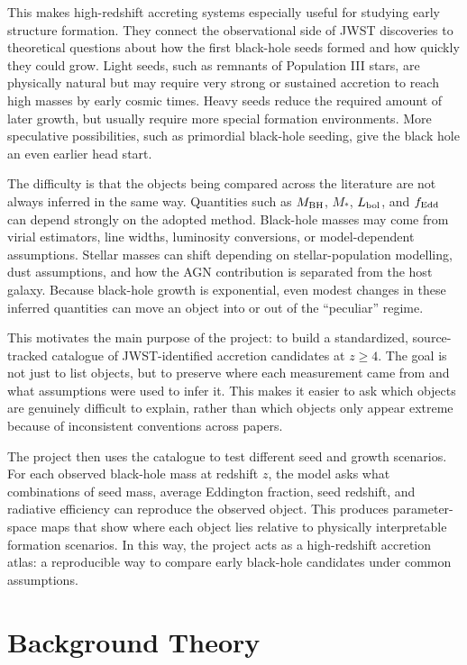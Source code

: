 \documentclass[letterpaper,12pt]{article}
\begin{document}
This makes high-redshift accreting systems especially useful for studying early structure formation. They connect the observational side of JWST discoveries to theoretical questions about how the first black-hole seeds formed and how quickly they could grow. Light seeds, such as remnants of Population III stars, are physically natural but may require very strong or sustained accretion to reach high masses by early cosmic times. Heavy seeds reduce the required amount of later growth, but usually require more special formation environments. More speculative possibilities, such as primordial black-hole seeding, give the black hole an even earlier head start.

The difficulty is that the objects being compared across the literature are not always inferred in the same way. Quantities such as $M_{\rm BH}$, $M_{*}$, $L_{\rm bol}$, and $f_{\rm Edd}$ can depend strongly on the adopted method. Black-hole masses may come from virial estimators, line widths, luminosity conversions, or model-dependent assumptions. Stellar masses can shift depending on stellar-population modelling, dust assumptions, and how the AGN contribution is separated from the host galaxy. Because black-hole growth is exponential, even modest changes in these inferred quantities can move an object into or out of the ``peculiar'' regime.

This motivates the main purpose of the project: to build a standardized, source-tracked catalogue of JWST-identified accretion candidates at $z \geq 4$. The goal is not just to list objects, but to preserve where each measurement came from and what assumptions were used to infer it. This makes it easier to ask which objects are genuinely difficult to explain, rather than which objects only appear extreme because of inconsistent conventions across papers.

The project then uses the catalogue to test different seed and growth scenarios. For each observed black-hole mass at redshift $z$, the model asks what combinations of seed mass, average Eddington fraction, seed redshift, and radiative efficiency can reproduce the observed object. This produces parameter-space maps that show where each object lies relative to physically interpretable formation scenarios. In this way, the project acts as a high-redshift accretion atlas: a reproducible way to compare early black-hole candidates under common assumptions.

\section{Background Theory}
\end{document}
